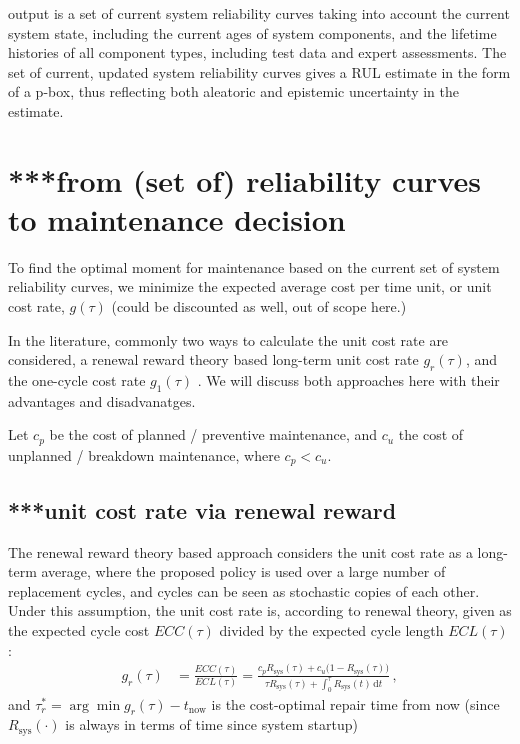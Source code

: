 \documentclass[authoryear]{elsarticle}
\newcommand{\dd}{\,\mathrm{d}}
\newcommand{\Rsys}{R_\text{sys}}
\def\tnow{t_\text{now}}
\begin{document}
output is a set of current system reliability curves
taking into account the current system state,
including the current ages of system components, 
and the lifetime histories of all component types,
including test data and expert assessments.
The set of current, updated system reliability curves gives a RUL estimate
in the form of a p-box, thus reflecting both aleatoric and epistemic uncertainty in the estimate.

\section{***from (set of) reliability curves to maintenance decision}

To find the optimal moment for maintenance based on the current set of system reliability curves,
we minimize the expected average cost per time unit,
or unit cost rate, $g(\tau)$ %
(could be discounted as well, out of scope here.)

In the literature, commonly two ways to calculate the unit cost rate are considered,
a renewal reward theory based long-term unit cost rate $g_r(\tau)$,
and the one-cycle cost rate $g_1(\tau)$ \citep{1996:mazzuchi-soyer}.
We will discuss both approaches here with their advantages and disadvanatges.

Let $c_p$ be the cost of planned / preventive maintenance, and $c_u$ the cost of unplanned / breakdown maintenance, where $c_p < c_u$.

\subsection{***unit cost rate via renewal reward}

The renewal reward theory based approach considers the unit cost rate as a long-term average,
where the proposed policy is used over a large number of replacement cycles,
and cycles can be seen as stochastic copies of each other.
Under this assumption, the unit cost rate is, according to renewal theory,
given as the expected cycle cost $ECC(\tau)$ divided by the expected cycle length $ECL(\tau)$:
\begin{align}
g_r(\tau) &= \frac{ECC(\tau)}{ECL(\tau)} = \frac{c_p \Rsys(\tau) + c_u \big(1-\Rsys(\tau)\big)}{\tau \Rsys(\tau) + \int_0^\tau \Rsys(t) \dd t}\,,
\end{align}
and $\tau_r^* = \arg\min g_r(\tau) - \tnow$ is the cost-optimal repair time from now
(since $\Rsys(\cdot)$ is always in terms of time since system startup)
\end{document}
